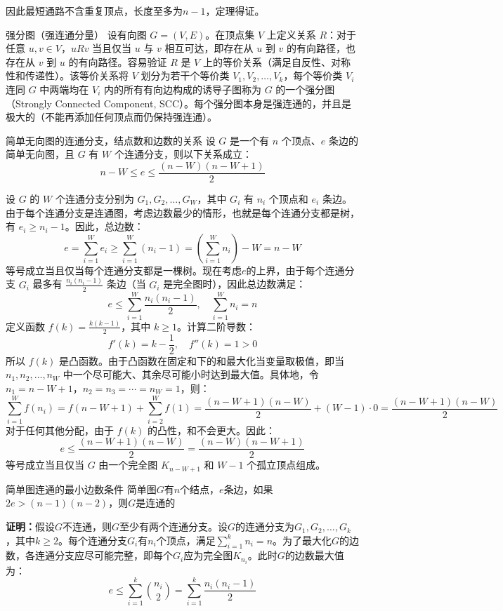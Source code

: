 \documentclass[lang=cn,11pt]{elegantbook}
\begin{document}
    因此最短通路不含重复顶点，长度至多为$n-1$，定理得证。
\begin{definition}{强分图（强连通分量）}
    设有向图 $G = (V, E)$。在顶点集 $V$ 上定义关系 $R$：对于任意 $u, v \in V$，$u R v$ 当且仅当 $u$ 与 $v$ 相互可达，即存在从 $u$ 到 $v$ 的有向路径，也存在从 $v$ 到 $u$ 的有向路径。容易验证 $R$ 是 $V$ 上的等价关系（满足自反性、对称性和传递性）。该等价关系将 $V$ 划分为若干个等价类 $V_1, V_2, \dots, V_k$，每个等价类 $V_i$ 连同 $G$ 中两端均在 $V_i$ 内的所有有向边构成的诱导子图称为 $G$ 的一个强分图（Strongly Connected Component, SCC）。每个强分图本身是强连通的，并且是极大的（不能再添加任何顶点而仍保持强连通）。
\end{definition}
\begin{theorem}{简单无向图的连通分支，结点数和边数的关系}
设 $G$ 是一个有 $n$ 个顶点、$e$ 条边的简单无向图，且 $G$ 有 $W$ 个连通分支，则以下关系成立：
\[n - W\leqslant e\leqslant \dfrac{(n-W)(n-W+1)}{2}\]
\end{theorem}
设 $G$ 的 $W$ 个连通分支分别为 $G_1, G_2, \ldots, G_W$，其中 $G_i$ 有 $n_i$ 个顶点和 $e_i$ 条边。由于每个连通分支是连通图，考虑边数最少的情形，也就是每个连通分支都是树，有 $e_i \geqslant n_i - 1$。因此，总边数：
   \[
   e = \sum_{i=1}^W e_i \geqslant \sum_{i=1}^W (n_i - 1) = \left(\sum_{i=1}^W n_i\right) - W = n - W
   \]
等号成立当且仅当每个连通分支都是一棵树。现在考虑$e$的上界，由于每个连通分支 $G_i$ 最多有 $\frac{n_i(n_i-1)}{2}$ 条边（当 $G_i$ 是完全图时），因此总边数满足：
   \[
   e \leqslant \sum_{i=1}^W \frac{n_i(n_i-1)}{2},\quad\sum_{i=1}^W n_i = n
   \]
   定义函数 $f(k) = \frac{k(k-1)}{2}$，其中 $k \geqslant 1$。计算二阶导数：
   \[
   f'(k) = k - \frac{1}{2}, \quad f''(k) = 1 > 0
   \]
   所以 $f(k)$ 是凸函数。由于凸函数在固定和下的和最大化当变量取极值，即当 $n_1, n_2, \ldots, n_W$ 中一个尽可能大、其余尽可能小时达到最大值。具体地，令 $n_1 = n-W+1$，$n_2 = n_3 = \cdots = n_W = 1$，则：
   \[
   \sum_{i=1}^W f(n_i) = f(n-W+1) + \sum_{i=2}^W f(1) = \frac{(n-W+1)(n-W)}{2} + (W-1) \cdot 0 = \frac{(n-W+1)(n-W)}{2}
   \]
   对于任何其他分配，由于 $f(k)$ 的凸性，和不会更大。因此：
   \[
   e \leqslant \frac{(n-W+1)(n-W)}{2} = \frac{(n-W)(n-W+1)}{2}
   \]
   等号成立当且仅当 $G$ 由一个完全图 $K_{n-W+1}$ 和 $W-1$ 个孤立顶点组成。
\begin{theorem}{简单图连通的最小边数条件}
    简单图$G$有$n$个结点，$e$条边，如果$2e>(n-1)(n-2)$，则$G$是连通的
\end{theorem}
\textbf{证明：}假设$G$不连通，则$G$至少有两个连通分支。设$G$的连通分支为$G_1, G_2, \ldots, G_k$，其中$k \geqslant 2$。每个连通分支$G_i$有$n_i$个顶点，满足$\sum_{i=1}^k n_i = n$。为了最大化$G$的边数，各连通分支应尽可能完整，即每个$G_i$应为完全图$K_{n_i}$。此时$G$的边数最大值为：
\[
e \leqslant \sum_{i=1}^k \binom{n_i}{2} = \sum_{i=1}^k \frac{n_i(n_i-1)}{2}
\]
\end{document}
